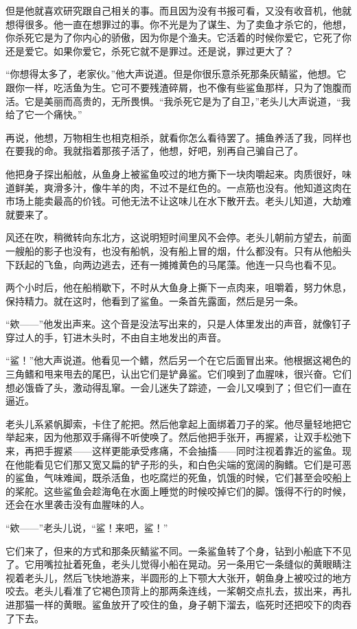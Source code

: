 \documentclass[12pt,UTF-8,openany]{ctexbook}
\begin{document}
\begin{large}
    但是他就喜欢研究跟自己相关的事。而且因为没有书报可看，又没有收音机，他就想得很多。他一直在想罪过的事。你不光是为了谋生、为了卖鱼才杀它的，他想，你杀死它是为了你内心的骄傲，因为你是个渔夫。它活着的时候你爱它，它死了你还是爱它。如果你爱它，杀死它就不是罪过。还是说，罪过更大了？
    
    “你想得太多了，老家伙。”他大声说道。但是你很乐意杀死那条灰鲭鲨，他想。它跟你一样，吃活鱼为生。它可不要残渣碎屑，也不像有些鲨鱼那样，只为了饱腹而活。它是美丽而高贵的，无所畏惧。“我杀死它是为了自卫，”老头儿大声说道，“我给了它一个痛快。”
    
    再说，他想，万物相生也相克相杀，就看你怎么看待罢了。捕鱼养活了我，同样也在要我的命。我就指着那孩子活了，他想，好吧，别再自己骗自己了。
    
    他把身子探出船舷，从鱼身上被鲨鱼咬过的地方撕下一块肉嚼起来。肉质很好，味道鲜美，爽滑多汁，像牛羊的肉，不过不是红色的。一点筋也没有。他知道这肉在市场上能卖最高的价钱。可他无法不让这味儿在水下散开去。老头儿知道，大劫难就要来了。
    
    风还在吹，稍微转向东北方，这说明短时间里风不会停。老头儿朝前方望去，前面一艘船的影子也没有，也没有船帆，没有船上冒的烟，什么都没有。只有从他船头下跃起的飞鱼，向两边逃去，还有一摊摊黄色的马尾藻。他连一只鸟也看不见。
    
    两个小时后，他在船梢歇下，不时从大鱼身上撕下一点肉来，咀嚼着，努力休息，保持精力。就在这时，他看到了鲨鱼。一条首先露面，然后是另一条。
    
    “欸——”他发出声来。这个音是没法写出来的，只是人体里发出的声音，就像钉子穿过人的手，钉进木头时，不由自主地发出的声音。
    
    “鲨！”他大声说道。他看见一个鳍，然后另一个在它后面冒出来。他根据这褐色的三角鳍和甩来甩去的尾巴，认出它们是铲鼻鲨。它们嗅到了血腥味，很兴奋。它们想必饿昏了头，激动得乱窜。一会儿迷失了踪迹，一会儿又嗅到了；但它们一直在逼近。
    
    老头儿系紧帆脚索，卡住了舵把。然后他拿起上面绑着刀子的桨。他尽量轻地把它举起来，因为他那双手痛得不听使唤了。然后他把手张开，再握紧，让双手松弛下来，再把手握紧——这样更能承受疼痛，不会抽搐——同时注视着靠近的鲨鱼。现在他能看见它们那又宽又扁的铲子形的头，和白色尖端的宽阔的胸鳍。它们是可恶的鲨鱼，气味难闻，既杀活鱼，也吃腐烂的死鱼，饥饿的时候，它们甚至会咬船上的桨舵。这些鲨鱼会趁海龟在水面上睡觉的时候咬掉它们的脚。饿得不行的时候，还会在水里袭击没有血腥味的人。
    
    “欸——”老头儿说，“鲨！来吧，鲨！”
    
    它们来了，但来的方式和那条灰鲭鲨不同。一条鲨鱼转了个身，钻到小船底下不见了。它用嘴拉扯着死鱼，老头儿觉得小船在晃动。另一条用它一条缝似的黄眼睛注视着老头儿，然后飞快地游来，半圆形的上下颚大大张开，朝鱼身上被咬过的地方咬去。老头儿看准了它褐色顶背上的那两条连线，一桨朝交点扎去，拔出来，再扎进那猫一样的黄眼。鲨鱼放开了咬住的鱼，身子朝下溜去，临死时还把咬下的肉吞了下去。
    

\end{large}
\end{document}
